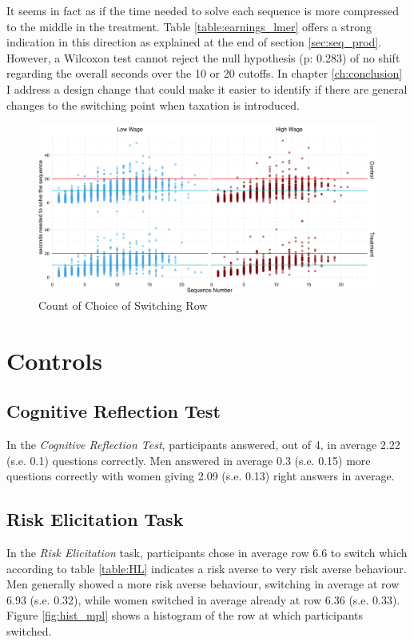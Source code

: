 It seems in fact as if the time needed to solve each sequence is more compressed to the middle in the treatment. Table \ref{table:earnings_lmer} offers a strong indication in this direction as explained at the end of section \ref{sec:seq_prod}. However, a Wilcoxon test cannot reject the null hypothesis (p: 0.283) of no shift regarding the overall seconds over the 10 or 20 cutoffs. In chapter \ref{ch:conclusion} I address a design change that could make it easier to identify if there are general changes to the switching point when taxation is introduced.\\

\begin{figure}
    \centering
    \includegraphics[width=\textwidth]{graphs/time_task_grid.png}
    \caption{Count of Choice of Switching Row}
    \label{fig:time_per_task}
\end{figure}

\section{Controls}

\subsection{Cognitive Reflection Test}
In the \textit{Cognitive Reflection Test}, participants answered, out of 4, in average 2.22 (s.e. 0.1) questions correctly. Men answered in average 0.3 (s.e. 0.15) more questions correctly with women giving 2.09 (s.e. 0.13) right answers in average.\\


\subsection{Risk Elicitation Task}
In the \textit{Risk Elicitation} task, participants chose in average row 6.6 to switch which according to table \ref{table:HL} indicates a risk averse to very risk averse behaviour. Men generally showed a more risk averse behaviour, switching in average at row 6.93 (s.e. 0.32), while women switched in average already at row 6.36 (s.e. 0.33). Figure \ref{fig:hist_mpl} shows a histogram of the row at which participants switched.\\

